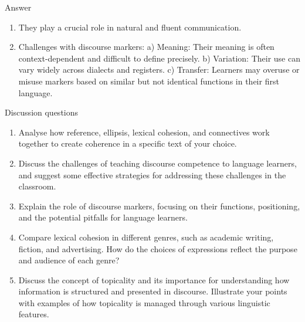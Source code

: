 \begin{tblsfilled}{Answer}
\begin{enumerate}[noitemsep, leftmargin=*]
    \item They play a crucial role in natural and fluent communication.
    \item Challenges with discourse markers: a) Meaning: Their meaning is often context-dependent and difficult to define precisely. b) Variation: Their use can vary widely across dialects and registers. c) Transfer: Learners may overuse or misuse markers based on similar but not identical functions in their first language.
\end{enumerate}
\end{tblsfilled}
\begin{tblslineshorizontal}{Discussion questions}
\begin{enumerate}[noitemsep]
    \item Analyse how reference, ellipsis, lexical cohesion, and connectives work together to create coherence in a specific text of your choice.
    \item Discuss the challenges of teaching discourse competence to language learners, and suggest some effective strategies for addressing these challenges in the classroom.
    \item Explain the role of discourse markers, focusing on their functions, positioning, and the potential pitfalls for language learners.
    \item Compare lexical cohesion in different genres, such as academic writing, fiction, and advertising. How do the choices of expressions reflect the purpose and audience of each genre?
    \item Discuss the concept of topicality and its importance for understanding how information is structured and presented in discourse. Illustrate your points with examples of how topicality is managed through various linguistic features.
\end{enumerate}
\end{tblslineshorizontal}
